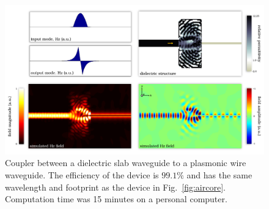 \begin{figure}[htb]
    \centering
    \includegraphics[width=\textwidth]{p3/5}
    \caption{Coupler between a dielectric slab waveguide to 
            a plasmonic wire waveguide.
        The efficiency of the device is $99.1\%$ and 
            has the same wavelength and footprint as the device in
            Fig.~\ref{fig:aircore}.
        Computation time was 15 minutes on a personal computer.
        }
        \label{fig:wire}
\end{figure}
% 
% 

